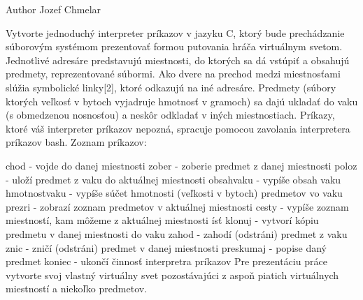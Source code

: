 \begin{DoxyAuthor}{Author}
Jozef Chmelar
\end{DoxyAuthor}
Vytvorte jednoduchý interpreter príkazov v jazyku C, ktorý bude prechádzanie súborovým systémom prezentovať formou putovania hráča virtuálnym svetom. Jednotlivé adresáre predstavujú miestnosti, do ktorých sa dá vstúpiť a obsahujú predmety, reprezentované súbormi. Ako dvere na prechod medzi miestnosťami slúžia symbolické linky\mbox{[}2\mbox{]}, ktoré odkazujú na iné adresáre. Predmety (súbory ktorých veľkosť v bytoch vyjadruje hmotnosť v gramoch) sa dajú ukladať do vaku (s obmedzenou nosnosťou) a neskôr odkladať v iných miestnostiach. Príkazy, ktoré váš interpreter príkazov nepozná, spracuje pomocou zavolania interpretera príkazov bash. Zoznam príkazov\+: \begin{DoxyVerb}chod - vojde do danej miestnosti
zober - zoberie predmet z danej miestnosti
poloz - uloží predmet z vaku do aktuálnej miestnosti
obsahvaku - vypíše obsah vaku
hmotnostvaku - vypíše súčet hmotnosti (veľkosti v bytoch) predmetov vo vaku
prezri - zobrazí zoznam predmetov v aktuálnej miestnosti
cesty - vypíše zoznam miestností, kam môžeme z aktuálnej miestnosti ísť
klonuj - vytvorí kópiu predmetu v danej miestnosti do vaku
zahod - zahodí (odstráni) predmet z vaku
znic - zničí (odstráni) predmet v danej miestnosti
preskumaj - popise daný predmet
koniec - ukončí činnosť interpretra príkazov
Pre prezentáciu práce vytvorte svoj vlastný virtuálny svet pozostávajúci z aspoň piatich virtuálnych miestností a niekoľko predmetov.\end{DoxyVerb}
 